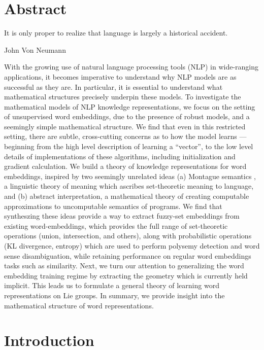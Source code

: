 \documentclass[11pt]{book}
\begin{document}
\chapter*{Abstract}
\label{ch:abstract}
\epigraph{It is only proper to realize that language is largely a historical accident.}{John Von Neumann}

With the growing use of natural language processing tools (NLP) in
wide-ranging applications, it becomes imperative to understand why NLP models
are as successful as they are. In particular, it is essential to understand
what mathematical structures precisely underpin these models. To investigate
the mathematical models of NLP knowledge representations, we focus on the
setting of unsupervised word embeddings, due to the presence of robust models,
and a seemingly simple mathematical structure. We find that even in this
restricted setting, there are subtle, cross-cutting concerns as to how the
model learns --- beginning from the high level description of learning a
``vector'', to the low level details of implementations of these algorithms,
including initialization and gradient calculation. We build a theory of
knowledge representations for word embeddings, inspired by two seemingly
unrelated ideas (a) Montague semantics \cite{sep-montague-semantics}, a linguistic theory of meaning which
ascribes set-theoretic meaning to language, and (b) abstract interpretation, a
mathematical theory of creating computable approximations to uncomputable
semantics of programs. We find that syntheszing these ideas provide a way to
extract fuzzy-set embeddings from existing word-embeddings, which provides the
full range of set-theoretic operations (union, intersection, and others), along
with probabilistic operations (KL divergence, entropy) which are used to
perform polysemy detection and word sense disambiguation, while retaining
performance on regular word embeddings tasks such as similarity. Next, we turn
our attention to generalizing the word embedding training regime by extracting
the geometry which is currently held implicit. This leads us to formulate a
general theory of learning word representations on Lie groups. In summary, we
provide insight into the mathematical structure of word representations.



\tableofcontents
\listoffigures
\listoftables

\chapter{Introduction}
\end{document}
